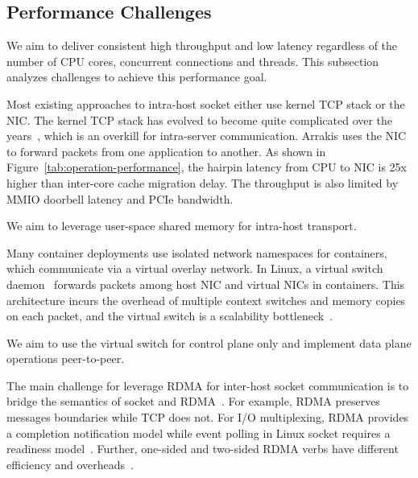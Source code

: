 \subsection{Performance Challenges}
\label{subsec:performance-challenges}

We aim to deliver consistent high throughput and low latency regardless of the number of CPU cores, concurrent connections and threads.
This subsection analyzes challenges to achieve this performance goal.

Most existing approaches to intra-host socket either use kernel TCP stack or the NIC.
The kernel TCP stack has evolved to become quite complicated over the years~\cite{yasukata2016stackmap}, which is an overkill 
for intra-server communication. %
Arrakis uses the NIC to forward packets from one application to another.
As shown in Figure~\ref{tab:operation-performance}, the hairpin latency from CPU to NIC is 25x higher than inter-core cache migration delay.
The throughput is also limited by MMIO doorbell latency and PCIe bandwidth.

We aim to leverage user-space shared memory for intra-host transport.

Many container deployments use isolated network namespaces for containers, which communicate via a virtual overlay network.
In Linux, a virtual switch daemon~\cite{pfaff2015design} forwards packets among host NIC and virtual NICs in containers.
This architecture incurs the overhead of multiple context switches and memory copies on each packet, and the virtual switch is a scalability bottleneck~\cite{pfefferle2015hybrid}.

We aim to use the virtual switch for control plane only and implement data plane operations peer-to-peer.

The main challenge for leverage RDMA for inter-host socket communication is to bridge the semantics of socket and RDMA~\cite{dragojevic2014farm}.
For example, RDMA preserves messages boundaries while TCP does not.
For I/O multiplexing, RDMA provides a completion notification model while event polling in Linux socket requires a readiness model~\cite{han2012megapipe}.
Further, one-sided and two-sided RDMA verbs have different efficiency and overheads~\cite{kalia2014using,kaminsky2016design}.

